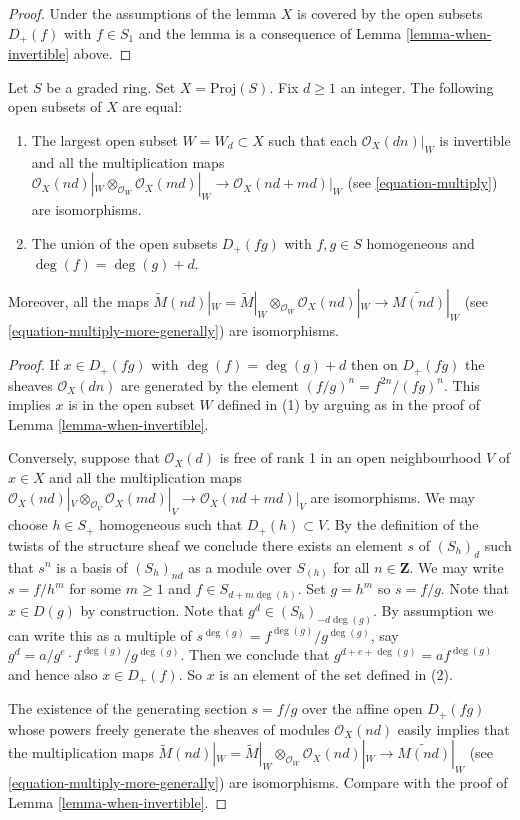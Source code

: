 \begin{proof}
Under the assumptions of the lemma $X$ is covered by the
open subsets $D_{+}(f)$ with $f \in S_1$ and the
lemma is a consequence of Lemma \ref{lemma-when-invertible} above.
\end{proof}

\begin{lemma}
\label{lemma-where-invertible}
Let $S$ be a graded ring. Set $X = \text{Proj}(S)$. Fix $d \geq 1$ an
integer. The following open subsets of $X$ are equal:
\begin{enumerate}
\item The largest open subset $W = W_d \subset X$ such that
each $\mathcal{O}_X(dn)|_W$ is invertible and all the
multiplication maps
$\mathcal{O}_X(nd)|_W \otimes_{\mathcal{O}_W} \mathcal{O}_X(md)|_W
\to \mathcal{O}_X(nd + md)|_W$
(see \ref{equation-multiply}) are isomorphisms.
\item The union of the open subsets $D_{+}(fg)$ with
$f, g \in S$ homogeneous and $\deg(f) = \deg(g) + d$.
\end{enumerate}
Moreover, all the maps
$\widetilde M(nd)|_W = \widetilde M|_W \otimes_{\mathcal{O}_W}
\mathcal{O}_X(nd)|_W \to \widetilde{M(nd)}|_W$
(see \ref{equation-multiply-more-generally}) are isomorphisms.
\end{lemma}

\begin{proof}
If $x \in D_{+}(fg)$ with $\deg(f) = \deg(g) + d$ then
on $D_{+}(fg)$ the sheaves $\mathcal{O}_X(dn)$
are generated by the element $(f/g)^n = f^{2n}/(fg)^n$. This implies $x$
is in the open subset $W$ defined in (1) by arguing as in the
proof of Lemma \ref{lemma-when-invertible}.

\medskip\noindent
Conversely, suppose that $\mathcal{O}_X(d)$ is free of rank 1
in an open neighbourhood $V$ of $x \in X$ and all the
multiplication maps
$\mathcal{O}_X(nd)|_V \otimes_{\mathcal{O}_V} \mathcal{O}_X(md)|_V
\to \mathcal{O}_X(nd + md)|_V$ are isomorphisms.
We may choose $h \in S_{+}$ homogeneous such that $D_{+}(h) \subset V$.
By the definition of the twists of the structure sheaf we conclude there
exists an element $s$ of $(S_h)_d$ such that $s^n$ is a basis of $(S_h)_{nd}$
as a module over $S_{(h)}$ for all $n \in \mathbf{Z}$.
We may write
$s = f/h^m$ for some $m \geq 1$ and $f \in S_{d + m \deg(h)}$.
Set $g = h^m$ so $s = f/g$. Note that $x \in D(g)$ by construction.
Note that $g^d \in (S_h)_{-d\deg(g)}$.
By assumption we can write this as a multiple of
$s^{\deg(g)} = f^{\deg(g)}/g^{\deg(g)}$, say
$g^d = a/g^e \cdot f^{\deg(g)}/g^{\deg(g)}$.
Then we conclude that $g^{d + e + \deg(g)} = a f^{\deg(g)}$
and hence also $x \in D_{+}(f)$. So $x$ is an element of the set defined
in (2).

\medskip\noindent
The existence of the generating section $s = f/g$ over
the affine open $D_{+}(fg)$ whose
powers freely generate the sheaves of modules
$\mathcal{O}_X(nd)$ easily implies that the multiplication maps
$\widetilde M(nd)|_W = \widetilde M|_W \otimes_{\mathcal{O}_W}
\mathcal{O}_X(nd)|_W \to \widetilde{M(nd)}|_W$
(see \ref{equation-multiply-more-generally})
are isomorphisms. Compare with the proof of Lemma \ref{lemma-when-invertible}.
\end{proof}

